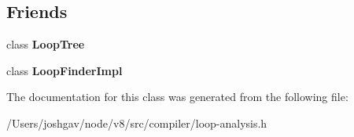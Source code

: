 \subsection*{Friends}
\begin{DoxyCompactItemize}
\item 
class {\bfseries Loop\+Tree}\hypertarget{classv8_1_1internal_1_1compiler_1_1_loop_tree_1_1_loop_aca571347144988d4e91401506c0faf91}{}\label{classv8_1_1internal_1_1compiler_1_1_loop_tree_1_1_loop_aca571347144988d4e91401506c0faf91}

\item 
class {\bfseries Loop\+Finder\+Impl}\hypertarget{classv8_1_1internal_1_1compiler_1_1_loop_tree_1_1_loop_a7c3aef85599c6822d83a965a321dfbc3}{}\label{classv8_1_1internal_1_1compiler_1_1_loop_tree_1_1_loop_a7c3aef85599c6822d83a965a321dfbc3}

\end{DoxyCompactItemize}


The documentation for this class was generated from the following file\+:\begin{DoxyCompactItemize}
\item 
/\+Users/joshgav/node/v8/src/compiler/loop-\/analysis.\+h\end{DoxyCompactItemize}
